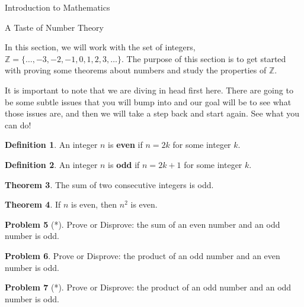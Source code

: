 \documentclass[11pt]{article}
\theoremstyle{definition}
\newtheorem{theorem}{Theorem}[section]
\newtheorem{definition}[theorem]{Definition}
\newtheorem{problem}[theorem]{Problem}
\begin{document}
\addtocounter{section}{0}

\begin{section}{Introduction to Mathematics}

\begin{subsection}{A Taste of Number Theory}


In this section, we will work with the set of integers, $\mathbb{Z} = \{\ldots, -3, -2, -1, 0, 1, 2, 3, \ldots\}$.  The purpose of this section is to get started with proving some theorems about numbers and study the properties of $\mathbb{Z}$.

It is important to note that we are diving in head first here.  There are going to be some subtle issues that you will bump into and our goal will be to see what those issues are, and then we will take a step back and start again.  See what you can do!

\begin{definition} An integer $n$ is \textbf{even} if $n=2k$ for some integer $k$. \end{definition}

\begin{definition} An integer $n$ is \textbf{odd} if $n=2k+1$ for some integer $k$. \end{definition}

\begin{theorem} The sum of two consecutive integers is odd. \end{theorem}

\begin{theorem} If $n$ is even, then $n^2$ is even. \end{theorem}

\begin{problem}[*] Prove or Disprove:  the sum of an even number and an odd number is odd. \end{problem}

\begin{problem}
Prove or Disprove: the product of an odd number and an even number is odd.
\end{problem}

\begin{problem}[*] Prove or Disprove: the product of an odd number and an odd number is odd. \end{problem}


\end{subsection}
\end{section}
\end{document}
